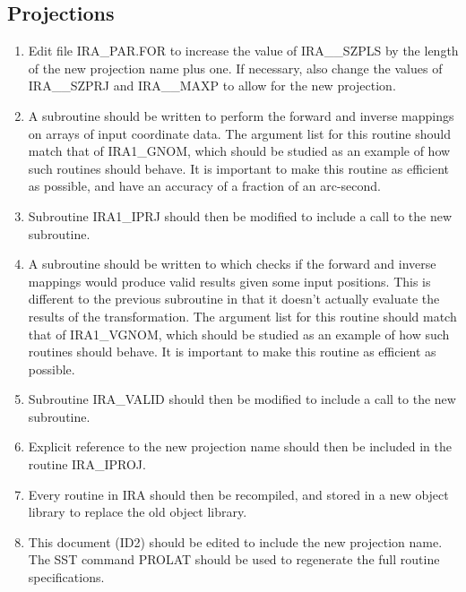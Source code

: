\subsection {Projections}
\begin {enumerate}

\item Edit file IRA\_PAR.FOR to increase the value of IRA\_\_SZPLS by the 
length of the new projection name plus one. If necessary, also change the values
of IRA\_\_SZPRJ and IRA\_\_MAXP to allow for the new projection. 

\item A subroutine should be written to perform the forward and inverse mappings
on arrays of input coordinate data. The argument list for this routine should
match that of IRA1\_GNOM, which should be studied as an example of how such
routines should behave. It is important to make this routine as efficient as
possible, and have an accuracy of a fraction of an arc-second. 

\item Subroutine IRA1\_IPRJ should then be modified to include a
call to the new subroutine. 

\item A subroutine should be written to which checks if the forward and inverse 
mappings would produce valid results given some input positions. This is 
different to the previous subroutine in that it doesn't actually evaluate the 
results of the transformation. The argument list for this routine should
match that of IRA1\_VGNOM, which should be studied as an example of how such
routines should behave. It is important to make this routine as efficient as
possible.

\item Subroutine IRA\_VALID should then be modified to include a
call to the new subroutine. 

\item Explicit reference to the new projection name should then be included in
the routine IRA\_IPROJ.

\item Every routine in IRA should then be recompiled, and stored in a new object
library to replace the old object library. 

\item This document (ID2) should be edited to include the new projection name.
The SST command PROLAT should be used to regenerate the full routine
specifications. 

\end {enumerate}

